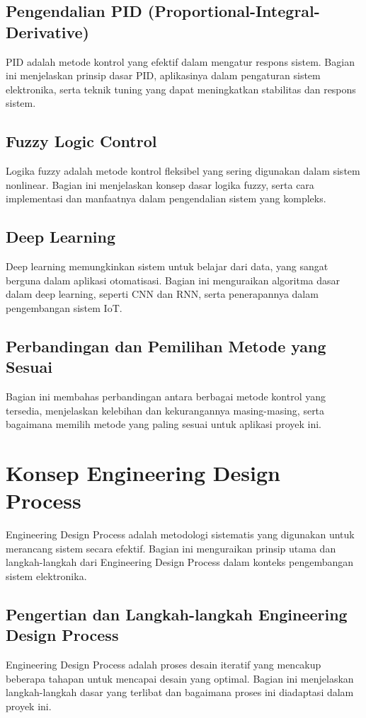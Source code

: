 \subsection{Pengendalian PID (Proportional-Integral-Derivative)}
PID adalah metode kontrol yang efektif dalam mengatur respons sistem. Bagian ini menjelaskan prinsip dasar PID, aplikasinya dalam pengaturan sistem elektronika, serta teknik tuning yang dapat meningkatkan stabilitas dan respons sistem.

\subsection{Fuzzy Logic Control}
Logika fuzzy adalah metode kontrol fleksibel yang sering digunakan dalam sistem nonlinear. Bagian ini menjelaskan konsep dasar logika fuzzy, serta cara implementasi dan manfaatnya dalam pengendalian sistem yang kompleks.

\subsection{Deep Learning}
Deep learning memungkinkan sistem untuk belajar dari data, yang sangat berguna dalam aplikasi otomatisasi. Bagian ini menguraikan algoritma dasar dalam deep learning, seperti CNN dan RNN, serta penerapannya dalam pengembangan sistem IoT.

\subsection{Perbandingan dan Pemilihan Metode yang Sesuai}
Bagian ini membahas perbandingan antara berbagai metode kontrol yang tersedia, menjelaskan kelebihan dan kekurangannya masing-masing, serta bagaimana memilih metode yang paling sesuai untuk aplikasi proyek ini.

\section{Konsep Engineering Design Process}
Engineering Design Process adalah metodologi sistematis yang digunakan untuk merancang sistem secara efektif. Bagian ini menguraikan prinsip utama dan langkah-langkah dari Engineering Design Process dalam konteks pengembangan sistem elektronika.

\subsection{Pengertian dan Langkah-langkah Engineering Design Process}
Engineering Design Process adalah proses desain iteratif yang mencakup beberapa tahapan untuk mencapai desain yang optimal. Bagian ini menjelaskan langkah-langkah dasar yang terlibat dan bagaimana proses ini diadaptasi dalam proyek ini.

